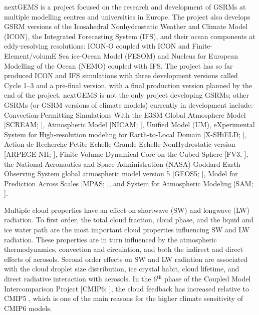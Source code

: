 \documentclass[12pt,a4paper]{article}
\begin{document}
nextGEMS is a project \citep{nextgems} focused on the
research and development of GSRMs at multiple modelling centres and
universities in Europe.  The project also develops GSRM versions of the
Icosahedral Nonhydrostatic Weather and Climate Model (ICON), the Integrated
Forecasting System (IFS), and their ocean components at eddy-resolving
resolutions: ICON-O coupled with ICON and Finite-Element/volumE Sea ice-Ocean
Model (FESOM) and Nucleus for European Modelling of the Ocean (NEMO) coupled
with IFS.  The project has so far produced ICON and IFS simulations with three
development versions called Cycle 1--3 and a pre-final version, with a final production
version planned by the end of the project. nextGEMS is not the only project
developing GSRMs; other GSRMs (or GSRM versions of climate models) currently in
development include: Convection-Permitting Simulations With the E3SM Global
Atmosphere Model [SCREAM; \cite{caldwell2021}], Atmospheric Model [NICAM;
\cite{satoh2008}], Unified Model (UM), eXperimental System for High-resolution
modeling for Earth-to-Local Domain [X-SHiELD; \cite{shield}], Action de
Recherche Petite Echelle Grande Echelle-NonHydrostatic version [ARPEGE-NH;
\cite{bubnova1995,voldoire2017}], Finite-Volume Dynamical Core on the Cubed
Sphere [FV3, \cite{lin2004}], the National Aeronautics and Space Administration
(NASA) Goddard Earth Observing System global atmospheric model version 5
[GEOS5; \cite{putman2011}], Model for Prediction Across Scales [MPAS;
\cite{skamarock2012}], and System for Atmospheric Modeling [SAM;
\cite{khairoutdinov2003}].

Multiple cloud properties have an effect on shortwave (SW) and longwave (LW)
radiation. To first order, the total cloud fraction, cloud phase, and the
liquid and ice water path are the most important cloud properties influencing
SW and LW radiation. These properties are  in turn influenced by the
atmospheric thermodynamics, convection and circulation, and both the indirect and direct
effects of aerosols. Second order effects on SW and LW radiation are associated
with the cloud droplet size distribution, ice crystal habit, cloud lifetime,
and direct radiative interaction with aerosols.  In the 6$^\mathrm{th}$ phase
of the Coupled Model Intercomparison Project [CMIP6; \cite{eyring2016}], the
cloud feedback has increased relative to CMIP5 \citep{zelinka2020}, which is
one of the main reasons for the higher climate sensitivity of CMIP6 models.
\end{document}
